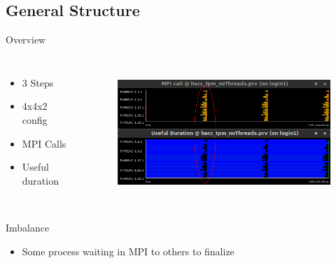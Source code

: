 \documentclass[aspectratio=169]{bredelebeamer}
\begin{document}
\subsection{General Structure}
\begin{frame}{Overview}

\begin{columns}


	\begin{itemize}
	\item 3 Steps
	\item 4x4x2 config
	\item MPI Calls
	\item Useful duration
	\end{itemize} 
	
	

\begin{figure}[h!]
  \centering
    \includegraphics[width=\textwidth,height=5cm,keepaspectratio]{"./img/general/useful_mpi_unbalanced"}
\end{figure}


\end{columns}


\begin{alertblock}{Imbalance}
\begin{itemize}
\item Some process waiting in MPI to others to finalize
\end{itemize}
\end{alertblock}

\end{frame}
\end{document}
